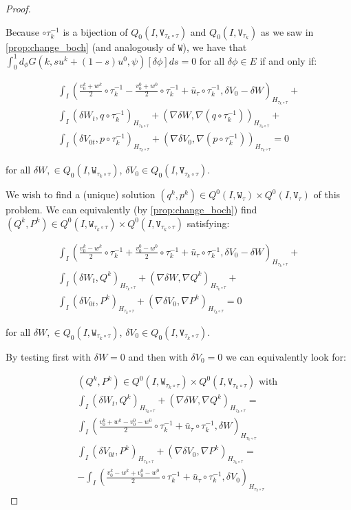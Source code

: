 \documentclass[english,a4paper,9pt,oneside]{scrbook}	%
\theoremstyle{break}
\newenvironment{mproof}[1][\proofname]{%
  \begin{proof}[#1]$ $\par\nobreak\ignorespaces
}{%
  \end{proof}
}
\renewcommand*{\proofname}{Proof}
\theoremstyle{remark}
\newcommand{\tw}[1]{\texttt{#1}}
\begin{document}
\begin{mproof}
Because $\circ \tau_k^{-1}$ is a bijection of $Q_0(I,\tw{V}_{\tau_k \circ \tau})$ and $Q_0(I,\tw{V}_{\tau_k})$ as we saw in \cref{prop:change_boch} (and analogously of $\tw{W}$), we have that  $\int_0^1 d_\phi G(k, su^k + (1-s)u^0,\psi)[\delta \phi]ds=0$ for all $\delta \phi \in E$ if and only if:

\begin{align*}
\int_I \left (\frac{v_0^k+w^k}{2}\circ \tau_k^{-1}- \frac{v_0^0+w^0}{2}\circ \tau_k^{-1}+\bar{u}_\tau\circ \tau_k^{-1} ,\delta V_0-\delta W\right)_{H_{\tau_k \circ \tau}}+\\
\int_I ( \delta W_t , q\circ \tau_k^{-1})_{H_{\tau_k \circ \tau}}+ (\nabla\delta W, \nabla( q\circ \tau_k^{-1}))_{H_{\tau_k \circ \tau}}+\\
\int_I ( \delta V_{0t},p \circ \tau_k^{-1})_{H_{\tau_k \circ \tau}} + ( \nabla \delta V_0, \nabla (p\circ \tau_k^{-1}))_{H_{\tau_k \circ \tau}} = 0
\end{align*}

for all $\delta W, \in Q_0(I, \tw{W}_{\tau_k \circ \tau})$, $ \delta V_{0} \in Q_0(I,\tw{V}_{\tau_k \circ \tau})$.

We wish to find a (unique) solution $(q^k, p^k) \in Q^0(I, \tw{W}_\tau)\times Q^0(I, \tw{V}_\tau)$ of this problem. We can equivalently (by \cref{prop:change_boch}) find $(Q^k, P^k) \in Q^0(I, \tw{W}_{\tau_k \circ \tau})\times Q^0(I, \tw{V}_{\tau_k \circ \tau})$ satisfying:

\begin{align*}
\int_I \left (\frac{v_0^k-w^k}{2}\circ \tau_k^{-1}+ \frac{v_0^0-w^0}{2}\circ \tau_k^{-1}+\bar{u}_\tau\circ \tau_k^{-1} ,\delta V_0-\delta W\right)_{H_{\tau_k \circ \tau}}+\\
\int_I (\delta W_t ,Q^k )_{H_{\tau_k \circ \tau}}+ (\nabla \delta W, \nabla Q^k)_{H_{\tau_k \circ \tau}}+\\
\int_I( \delta V_{0t},P^k)_{H_{\tau_k \circ \tau}} + ( \nabla \delta V_0, \nabla P^k)_{H_{\tau_k \circ \tau}} = 0
\end{align*}

for all $\delta W, \in Q_0(I, \tw{W}_{\tau_k \circ \tau})$, $ \delta V_{0} \in Q_0(I,\tw{V}_{\tau_k \circ \tau})$.

By testing first with $\delta W=0$ and then with $\delta V_0=0$ we can equivalently look for:

\begin{align*}
(Q^k, P^k) \in Q^0(I, \tw{W}_{\tau_k \circ \tau})\times Q^0(I, \tw{V}_{\tau_k \circ \tau}) \text{ with }\\
\int_I (\delta W_t ,Q^k)_{H_{\tau_k \circ \tau}}+ (\nabla \delta W, \nabla Q^k)_{H_{\tau_k \circ \tau}} =\\ \int_I \left (\frac{v_0^k+w^k-v_0^0-w^0}{2}\circ \tau_k^{-1}+\bar{u}_\tau\circ \tau_k^{-1} ,\delta W\right)_{H_{\tau_k \circ \tau}}\\
\int_I ( \delta V_{0t},P^k)_{H_{\tau_k \circ \tau}}+ ( \nabla \delta V_0, \nabla P^k)_{H_{\tau_k \circ \tau}} =\\- \int_I \left (\frac{v_0^k-w^k+v_0^0-w^0}{2}\circ \tau_k^{-1}+\bar{u}_\tau\circ \tau_k^{-1} ,\delta V_0\right)_{H_{\tau_k \circ \tau}}
\end{align*}


\end{mproof}
\end{document}
